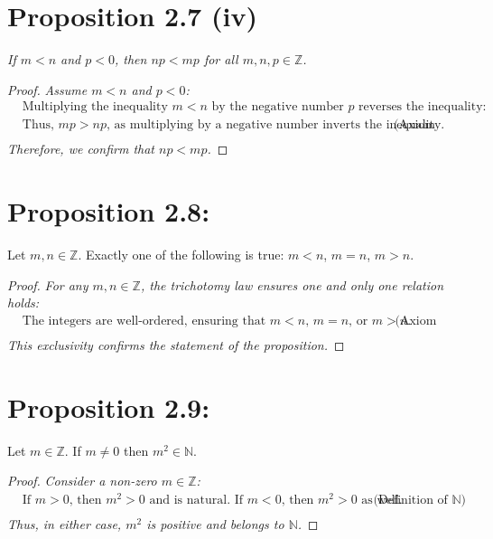 \section*{Proposition 2.7 (iv)}
\textit{If $m < n$ and $p < 0$, then $np < mp$ for all $m, n, p \in \mathbb{Z}$.}
\begin{proof}
    \textit{Assume $m < n$ and $p < 0$:}
    \begin{align*}
        & \text{Multiplying the inequality $m < n$ by the negative number $p$ reverses the inequality:} & & \\
        & \text{Thus, $mp > np$, as multiplying by a negative number inverts the inequality.} & & \text{(Axiom 1.1(ii))} \\
    \end{align*}
    \textit{Therefore, we confirm that $np < mp$.}
\end{proof}



\section*{Proposition 2.8:}
Let $m,n \in \mathbb{Z}$. Exactly one of the following is true: $m < n$, $m = n$, $m > n$.
\begin{proof}
    \textit{For any $m, n \in \mathbb{Z}$, the trichotomy law ensures one and only one relation holds:}
    \begin{align*}
        & \text{The integers are well-ordered, ensuring that $m < n$, $m = n$, or $m > n$.} & & \text{(Axiom 1.1)} \\
    \end{align*}
    \textit{This exclusivity confirms the statement of the proposition.}
\end{proof}



\section*{Proposition 2.9:}
Let $m \in \mathbb{Z}$. If $m \neq 0$ then $m^2 \in \mathbb{N}$.
\begin{proof}
    \textit{Consider a non-zero $m \in \mathbb{Z}$:}
    \begin{align*}
        & \text{If $m > 0$, then $m^2 > 0$ and is natural. If $m < 0$, then $m^2 > 0$ as well.} & & \text{(Definition of $\mathbb{N}$)} \\
    \end{align*}
    \textit{Thus, in either case, $m^2$ is positive and belongs to $\mathbb{N}$.}
\end{proof}




